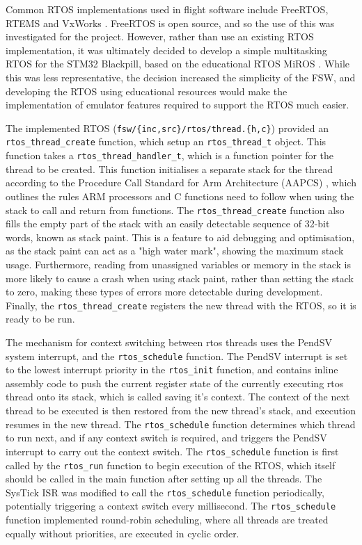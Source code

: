 \documentclass[../report.tex]{subfiles}
\begin{document}
Common RTOS implementations used in flight software include FreeRTOS, RTEMS and
VxWorks \citep{Cratere_2024}. FreeRTOS is open source, and so the use of this
was investigated for the project. However, rather than use an existing RTOS
implementation, it was ultimately decided to develop a simple multitasking RTOS
for the STM32 Blackpill, based on the educational RTOS MiROS \citep{miros}.
While this was less representative, the decision increased the simplicity of
the FSW, and developing the RTOS using educational resources would make the
implementation of emulator features required to support the RTOS much easier.

The implemented RTOS (\lstinline|fsw/{inc,src}/rtos/thread.{h,c}|) provided an
\lstinline|rtos_thread_create| function, which setup an
\lstinline|rtos_thread_t| object. This function takes a
\lstinline|rtos_thread_handler_t|, which is a function pointer for the thread
to be created. This function initialises a separate stack for the
thread according to the Procedure Call Standard for Arm Architecture (AAPCS)
\citep{AAPCS}, which outlines the rules ARM processors and C functions need to
follow when using the stack to call and return from functions. The
\lstinline|rtos_thread_create| function also fills the empty part of the stack
with an easily detectable sequence of 32-bit words, known as stack paint. This
is a feature to aid debugging and optimisation, as the stack paint can act as a
"high water mark", showing the maximum stack usage. Furthermore, reading from
unassigned variables or memory in the stack is more likely to cause a crash
when using stack paint, rather than setting the stack to zero, making these
types of errors more detectable during development. Finally, the
\lstinline|rtos_thread_create| registers the new thread with the RTOS, so it is
ready to be run.

The mechanism for context switching between rtos threads uses the PendSV system
interrupt, and the \lstinline|rtos_schedule| function. The PendSV interrupt is
set to the lowest interrupt priority in the \lstinline|rtos_init| function, and
contains inline assembly code to push the current register state of the
currently executing rtos thread onto its stack, which is called saving it's
context. The context of the next thread to be executed is then restored from
the new thread's stack, and execution resumes in the new thread. The
\lstinline|rtos_schedule| function determines which thread to run next, and if
any context switch is required, and triggers the PendSV interrupt to carry out
the context switch. The \lstinline|rtos_schedule| function is first called by
the \lstinline|rtos_run| function to begin execution of the RTOS, which itself
should be called in the main function after setting up all the threads.
The SysTick ISR was modified to call the \lstinline|rtos_schedule| function
periodically, potentially triggering a context switch every millisecond. The
\lstinline|rtos_schedule| function implemented round-robin scheduling, where
all threads are treated equally without priorities, are executed in cyclic
order.
\end{document}
